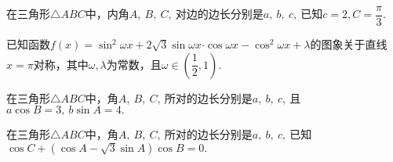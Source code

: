 \documentclass{BHCexam}
\begin{document}
\begin{questions}
\kongbai
\qs 在三角形$\triangle ABC$中，内角$ A,~B,~C,~ $对边的边长分别是$ a,~b,~c ,~$已知$ c=2,C=\dfrac{\pi}{3} .$
\kongbai
\qs 已知函数$f(x)=\sin^2 \omega x+2\sqrt{3}\sin \omega x\bm{\cdot}\cos \omega x-\cos^2 \omega x+\lambda$的图象关于直线$ x=\pi $对称，其中$ {\omega ,\lambda} $为常数，且$ \omega \in \left(\dfrac{1}{2},1\right). $
\kongbai
\qs 在三角形$\triangle ABC$中，角$A,~B,~C,~$所对的边长分别是$a,~b,~c,~$且$ a\cos B=3,~b\sin A=4. $
\kongbai
\qs 在三角形$\triangle ABC$中，角$A,~B,~C,~$所对的边长分别是$a,~b,~c,~$已知$ \cos C+(\cos A-\sqrt{3}\sin A)\cos B=0. $
\begin{parts}

\end{parts}
\end{questions}
\end{document}
